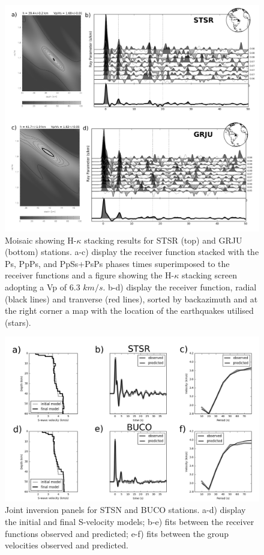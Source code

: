 \documentclass[paper,11pt]{geophysics}
\begin{document}
\begin{figure}[!ht]
\begin{center}
\includegraphics[width=\textwidth]{Fig/mosaico_GRJU_STSR.png}
\caption{Moisaic showing H-$\kappa$ stacking results for STSR (top) and GRJU (bottom) stations. a-c) display the receiver function stacked with the Ps, PpPs, and PpSs+PsPs phases times superimposed to the receiver functions and a figure showing the H-$\kappa$ stacking screen adopting a Vp of 6.3 $km/s$. b-d) display the receiver function, radial (black lines) and tranverse (red lines), sorted by backazimuth and at the right corner a map with the location of the earthquakes utilised (stars).}
\label{moisaic_FR}
\end{center}
\end{figure}

\begin{figure}[!ht]
\begin{center}
\includegraphics[width=\textwidth]{Fig/joint_inversion_results.png}
\caption{Joint inversion panels for STSN and BUCO stations. a-d) display the initial and final S-velocity models; b-e) fits between the receiver
functions observed and predicted; e-f) fits between the group velocities observed and predicted.}
\label{joint_inversion}
\end{center}
\end{figure}
\end{document}
